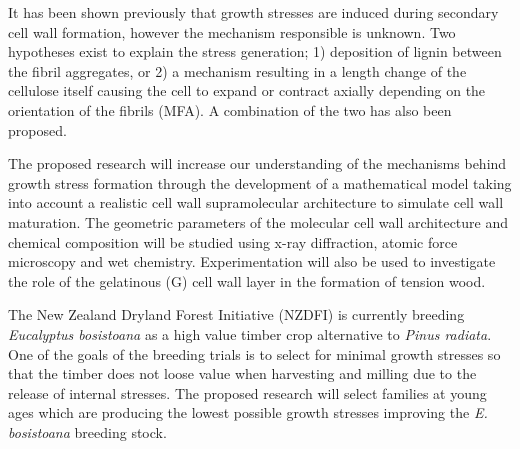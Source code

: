 It has been shown previously that growth stresses are induced during secondary
cell wall formation, however the mechanism responsible is unknown. Two
hypotheses exist to explain the stress generation; 1) deposition of lignin
between the fibril aggregates, or 2) a mechanism resulting in
a length change of the cellulose itself causing the cell to expand or contract axially
depending on the orientation of the fibrils (MFA). A combination of the two has also been proposed.

The proposed research will increase our understanding of the mechanisms behind
growth stress formation through the development of a mathematical model taking
into account a realistic cell wall supramolecular architecture to simulate cell wall 
maturation. The geometric parameters of the molecular cell wall architecture and
chemical composition will be studied using x-ray diffraction, atomic force
microscopy and wet chemistry. Experimentation will also be used to
investigate the role of the gelatinous (G) cell wall layer in the formation of tension wood.

The New Zealand Dryland Forest Initiative (NZDFI) is currently breeding
\textit{Eucalyptus bosistoana} as a high value timber crop alternative to
\textit{Pinus radiata}. One of the goals of the breeding trials is to select for
minimal growth stresses so that the timber does not loose value when harvesting
and milling due to the release of internal stresses. The proposed research will
select families at young ages which are producing the lowest possible growth
stresses improving the \textit{E. bosistoana} breeding stock.